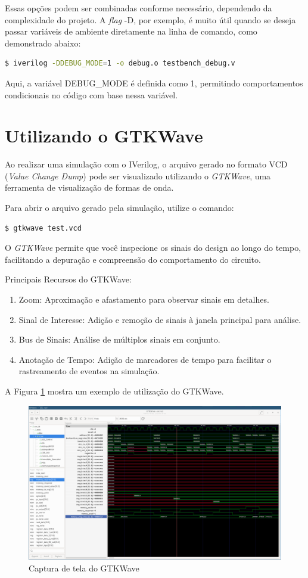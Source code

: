 \documentclass{report}
\begin{document}
Essas opções podem ser combinadas conforme necessário, dependendo da complexidade do projeto. A \textit{flag} -D, por exemplo, é muito útil quando se deseja passar variáveis de ambiente diretamente na linha de comando, como demonstrado abaixo:

\begin{lstlisting}[language=bash]
$ iverilog -DDEBUG_MODE=1 -o debug.o testbench_debug.v
\end{lstlisting}

Aqui, a variável DEBUG\_MODE é definida como 1, permitindo comportamentos condicionais no código com base nessa variável.

\section{Utilizando o GTKWave}

Ao realizar uma simulação com o IVerilog, o arquivo gerado no formato VCD (\textit{Value Change Dump}) pode ser visualizado utilizando o \textit{GTKWave}, uma ferramenta de visualização de formas de onda.

Para abrir o arquivo gerado pela simulação, utilize o comando:

\begin{lstlisting}[language=bash] 
$ gtkwave test.vcd 
\end{lstlisting}

O \textit{GTKWave} permite que você inspecione os sinais do design ao longo do tempo, facilitando a depuração e compreensão do comportamento do circuito.

Principais Recursos do GTKWave:
\begin{enumerate}
    \item Zoom: Aproximação e afastamento para observar sinais em detalhes.
    \item Sinal de Interesse: Adição e remoção de sinais à janela principal para análise.
    \item Bus de Sinais: Análise de múltiplos sinais em conjunto.
    \item Anotação de Tempo: Adição de marcadores de tempo para facilitar o rastreamento de eventos na simulação.
\end{enumerate}

A Figura \ref{fig:gtkwave} mostra um exemplo de utilização do GTKWave.

\begin{figure}[H]
    \centering
    \includegraphics[width=0.8\linewidth]{gtkwave.png}
    \caption{Captura de tela do GTKWave}
    \label{fig:gtkwave}
\end{figure}
\end{document}
